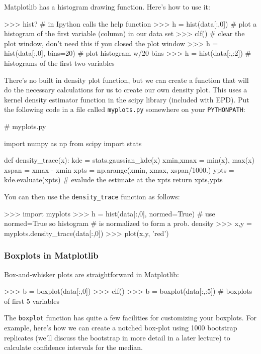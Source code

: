 Matplotlib has a histogram drawing function. Here's how to use it:

\begin{python}
>>> hist? # in Ipython calls the help function
>>> h = hist(data[:,0]) # plot a histogram of the first variable (column) in our data set
>>> clf() # clear the plot window, don't need this if you closed the plot window
>>> h = hist(data[:,0], bins=20) # plot histogram w/20 bins
>>> h = hist(data[:,:2])  # histograms of the first two variables    
\end{python}
There's no built in density plot function, but we can create a function
that will do the necessary calculations for us to create our own density
plot. This uses a kernel density estimator function in the scipy library
(included with EPD). Put the following code in a file called
\lstinline!myplots.py! somewhere on your \lstinline!PYTHONPATH!:

\begin{python}
# myplots.py

import numpy as np
from scipy import stats

def density_trace(x):
    kde = stats.gaussian_kde(x)
    xmin,xmax = min(x), max(x)
    xspan = xmax - xmin
    xpts = np.arange(xmin, xmax, xspan/1000.)
    ypts = kde.evaluate(xpts) # evalude the estimate at the xpts
    return xpts,ypts
\end{python}
You can then use the \lstinline!density_trace! function as follows:

\begin{python}
>>> import myplots
>>> h = hist(data[:,0], normed=True) # use normed=True so histogram 
                           # is normalized to form a prob. density
>>> x,y = myplots.density_trace(data[:,0])
>>> plot(x,y, 'red')    
\end{python}
\subsubsection{Boxplots in Matplotlib}

Box-and-whisker plots are straightforward in Matplotlib:

\begin{python}
>>> b = boxplot(data[:,0])
>>> clf()
>>> b = boxplot(data[:,:5]) # boxplots of first 5 variables
\end{python}
The \lstinline!boxplot! function has quite a few facilities for
customizing your boxplots. For example, here's how we can create a
notched box-plot using 1000 bootstrap replicates (we'll discuss the
bootstrap in more detail in a later lecture) to calculate confidence
intervals for the median.

